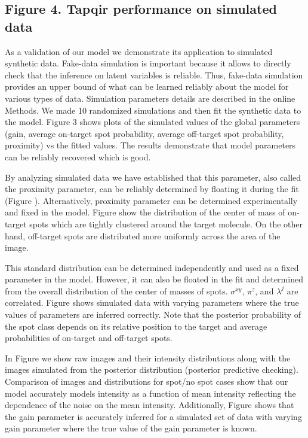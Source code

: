 \subsection{Figure 4. Tapqir performance on simulated data}

As a validation of our model we demonstrate its application to simulated synthetic data. Fake-data simulation is important because it allows to directly check that the inference on latent variables is reliable. Thus, fake-data simulation provides an upper bound of what can be learned reliably about the model for various types of data. Simulation parameters details are described in the online Methods. We made 10 randomized simulations and then fit the synthetic data to the model. Figure 3 shows plots of the simulated values of the global parameters (gain, average on-target spot probability, average off-target spot probability, proximity) vs the fitted values. The results demonstrate that model parameters can be reliably recovered which is good.

By analyzing simulated data we have established that this parameter, also called the proximity parameter, can be reliably determined by floating it during the fit (Figure ). Alternatively, proximity parameter can be determined experimentally and fixed in the model. Figure show the distribution of the center of mass of on-target spots which are tightly clustered around the target molecule. On the other hand, off-target spots are distributed more uniformly across the area of the image.

This standard distribution can be determined independently and used as a fixed parameter in the model. However, it can also be floated in the fit and determined from the overall distribution of the center of masses of spots. $\sigma^{xy}$, $\pi^z$, and $\lambda^j$ are correlated. Figure shows simulated data with varying parameters where the true values of parameters are inferred correctly. Note that the posterior probability of the spot class depends on its relative position to the target and average probabilities of on-target and off-target spots.

In Figure we show raw images and their intensity distributions along with the images simulated from the posterior distribution (posterior predictive checking). Comparison of images and distributions for spot/no spot cases show that our model accurately models intensity as a function of mean intensity reflecting the dependence of the noise on the mean intensity. Additionally, Figure shows that the gain parameter is accurately inferred for a simulated set of data with varying gain parameter where the true value of the gain parameter is known.

